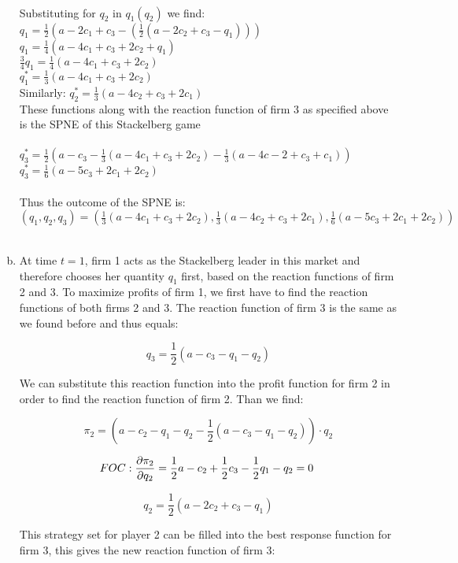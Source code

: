 \documentclass[a4paper]{article}
\begin{document}
\begin{enumerate}[(a)]
\\
Substituting for $q_2$ in $q_1(q_2)$ we find:\\
$q_1=\frac{1}{2}(a-2c_1+c_3-(\frac{1}{2}(a-2c_2+c_3-q_1)))$\\
$q_1=\frac{1}{4}(a-4c_1+c_3+2c_2+q_1)$\\
$\frac{3}{4}q_1=\frac{1}{4}(a-4c_1+c_3+2c_2)$\\
$q_1^*=\frac{1}{3}(a-4c_1+c_3+2c_2)$\\
Similarly: $q_2^*=\frac{1}{3}(a-4c_2+c_3+2c_1)$\\
These functions along with the reaction function of firm 3 as specified above is the SPNE of this Stackelberg game\\
\\
$q_3^*=\frac{1}{2}(a-c_3-\frac{1}{3}(a-4c_1+c_3+2c_2)-\frac{1}{3}(a-4c-2+c_3+c_1))$\\
$q_3^*=\frac{1}{6}(a-5c_3+2c_1+2c_2)$\\
\\
Thus the outcome of the SPNE is:\\
$(q_1,q_2,q_3)=(\frac{1}{3}(a-4c_1+c_3+2c_2),\frac{1}{3}(a-4c_2+c_3+2c_1),\frac{1}{6}(a-5c_3+2c_1+2c_2))$\\
\\
\item

At time \(t = 1\), firm 1 acts as the Stackelberg leader in this market
and therefore chooses her quantity \(q_{1}\) first, based on the
reaction functions of firm 2 and 3. To maximize profits of firm 1, we
first have to find the reaction functions of both firms 2 and 3. The
reaction function of firm 3 is the same as we found before and thus
equals:

\[q_{3} = \frac{1}{2}(a - c_{3} - q_{1} - q_{2})\]

We can substitute this reaction function into the profit function for
firm 2 in order to find the reaction function of firm 2. Than we find:

\[\pi_{2} = \left( a - c_{2} - q_{1} - q_{2} - \frac{1}{2}\left( a - c_{3} - q_{1} - q_{2} \right) \right) \cdot q_{2}\]

\[FOC: \frac{\partial \pi_2}{\partial q_2}=\frac{1}{2}a - c_{2} + \frac{1}{2}c_{3} - \frac{1}{2}q_{1} - q_{2} = 0 \\
\  \]

\[q_{2} = \frac{1}{2}(a - 2c_{2} + c_{3} - q_{1})\]

This strategy set for player 2 can be filled into the best response
function for firm 3, this gives the new reaction function of firm 3:


\end{enumerate}
\end{document}
